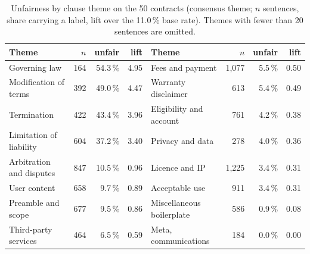 \begin{table}[t]
\caption{Unfairness by clause theme on the 50 \corpus{} contracts (consensus theme; $n$ sentences, share carrying a \corpus{} label, lift over the 11.0\,\% base rate). Themes with fewer than 20 sentences are omitted.}
\label{tab:themes}
\centering
\footnotesize\setlength{\tabcolsep}{3.5pt}%
\begin{tabular}{@{}lrrr@{\quad}lrrr@{}}
\toprule
Theme & $n$ & unfair & lift & Theme & $n$ & unfair & lift \\
\midrule
Governing law & 164 & 54.3\,\% & 4.95 & Fees and payment & 1,077 & 5.5\,\% & 0.50 \\
Modification of terms & 392 & 49.0\,\% & 4.47 & Warranty disclaimer & 613 & 5.4\,\% & 0.49 \\
Termination & 422 & 43.4\,\% & 3.96 & Eligibility and account & 761 & 4.2\,\% & 0.38 \\
Limitation of liability & 604 & 37.2\,\% & 3.40 & Privacy and data & 278 & 4.0\,\% & 0.36 \\
Arbitration and disputes & 847 & 10.5\,\% & 0.96 & Licence and IP & 1,225 & 3.4\,\% & 0.31 \\
User content & 658 & 9.7\,\% & 0.89 & Acceptable use & 911 & 3.4\,\% & 0.31 \\
Preamble and scope & 677 & 9.5\,\% & 0.86 & Miscellaneous boilerplate & 586 & 0.9\,\% & 0.08 \\
Third-party services & 464 & 6.5\,\% & 0.59 & Meta, communications & 184 & 0.0\,\% & 0.00 \\
\bottomrule
\end{tabular}
\end{table}

